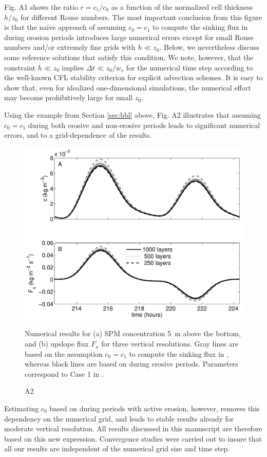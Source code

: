 Fig. A1 shows the ratio $r=c_1/c_0$ as a function of the normalized
cell thickness $h/z_0$ for different Rouse numbers. The most important
conclusion from this figure is that the naive approach of assuming
$c_0 = c_1$ to compute the sinking flux in  during erosion
periods introduces large numerical errors except for small Rouse
numbers and/or extremely fine grids with $h \ll z_0$. Below, we
nevertheless discuss some reference solutions that satisfy this
condition. We note, however, that the constraint $h \ll z_0$ implies
$\Delta t \ll z_0 / w_s$ for the numerical time step according to the
well-known CFL stability criterion for explicit advection schemes. It
is easy to show that, even for idealized one-dimensional simulations,
the numerical effort may become prohibitively large for small $z_0$.

Using the example from Section \ref{sec:bbl} above, Fig. A2
illustrates that assuming $c_0 = c_1$ during both erosive and
non-erosive periods leads to significant numerical errors, and to a
grid-dependence of the results. 
\begin{figure}[h]
  \noindent\includegraphics[width=29pc,angle=0]{bilder/appendix.pdf}\\ \caption{A2}{Numerical
    results for (a) SPM concentration 5~m above the bottom, and (b)
    upslope flux $F_x$ for three vertical resolutions. Gray lines are
    based on the assumption $c_0 = c_1$ to compute the sinking flux in
    , whereas black lines are based on  during erosive
    periods. Parameters correspond to Case 1 in
    . \label{convergence}}
\end{figure}
Estimating $c_0$ based on 
during periods with active erosion, however, removes this dependency
on the numerical grid, and leads to stable results already for
moderate vertical resolution. All results discussed in this manuscript
are therefore based on this new expression. Convergence studies were
carried out to insure that all our results are independent of the
numerical grid size and time step.